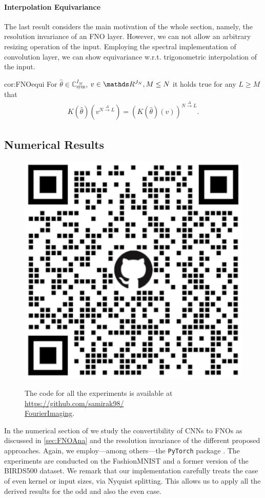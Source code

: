 \paragraph{Interpolation Equivariance}
%
%
The last result considers the main motivation of the whole section, namely, the resolution invariance of an FNO layer. However, we can not allow an arbitrary resizing operation of the input. Employing the spectral implementation of convolution layer, we can show equivariance w.r.t. trigonometric interpolation of the input.
%
%
\begin{corollary}{}{cor:FNOequi}
	For $\hat{\theta} \in \mathbb{C}^{I_M}_{\text{sym}}$, $v \in \R^{J_N}, M \leq N$ it holds true for any $L \geq M$ that
	\begin{align*}
		K(\hat{\theta})(v^{N \xrightarrow{\Delta} L}) = \left( K(\hat{\theta})(v) \right)^{N \xrightarrow{\Delta} L}.
	\end{align*}
\end{corollary}


\subsection{Numerical Results}\label{sec:FNONum}
%
%
\begin{figure}
\begin{center}
	\includegraphics[width=.4\textwidth]{atelier/FNO/FNOQR.png}
\end{center}
The code for all the experiments is available at \href{https://github.com/samirak98/FourierImaging}{https://github.com/samirak98/}\\
\href{https://github.com/samirak98/FourierImaging}{FourierImaging}.
\end{figure}
%
%
In the numerical section of \cite{kabri2023resolution} we study the convertibility of CNNs to FNOs as discussed in \cref{sec:FNOAna} and the resolution invariance of the different proposed approaches. Again, we employ---among others---the \texttt{PyTorch} package \cite{paszke2019pytorch}. The experiments are conducted on the FashionMNIST \cite{Han17} and a former version of the BIRDS500 \cite{pio450} dataset. We remark that our implementation carefully treats the case of even kernel or input sizes, via Nyquist splitting. This allows us to apply all the derived results for the odd and also the even case.
%
%
